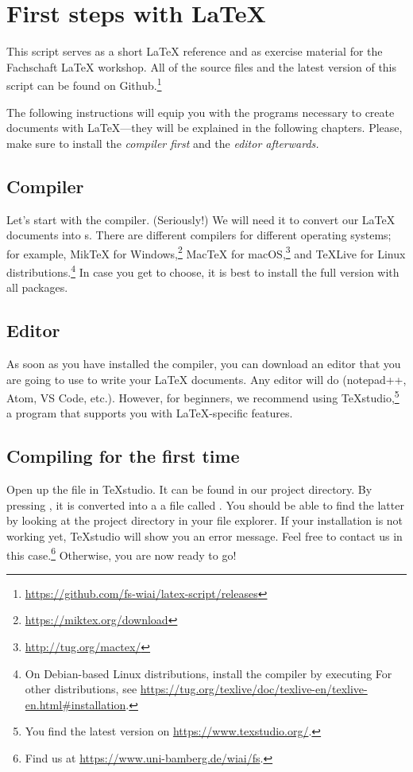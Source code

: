 \newpage
{}
\pagecolor{latexblue}

\chapter*{First steps with \LaTeX}

This script serves as a short \LaTeX{} reference and as exercise material for the Fachschaft  \LaTeX{} workshop.
All of the source files and the latest version of this script can be found on Github.\footnote{\url{https://github.com/fs-wiai/latex-script/releases}}

The following instructions will equip you with the programs necessary to create documents with \LaTeX{}---they will be explained in the following chapters.
Please, make sure to install the \emph{compiler first} and the \emph{editor afterwards}\textit{.}

\section*{Compiler}
Let’s start with the compiler.
(Seriously!)
We will need it to convert our \LaTeX{} documents into s.
There are different compilers for different operating systems;
for example, MikTeX for Windows,\footnote{\url{https://miktex.org/download}} Mac\TeX{} for macOS,\footnote{\url{http://tug.org/mactex/}} and \TeX{}Live for Linux distributions.\footnote{On Debian-based Linux distributions, install the compiler by executing 
For other distributions, see \url{https://tug.org/texlive/doc/texlive-en/texlive-en.html\#installation}.}
In case you get to choose, it is best to install the full version with all packages.

\section*{Editor}
As soon as you have installed the compiler, you can download an editor that you are going to use to write your \LaTeX{} documents.
Any editor will do (notepad++, Atom, VS Code, etc.).
However, for beginners, we recommend using \TeX{}studio,\footnote{You find the latest version on \url{https://www.texstudio.org/}.} a program that supports you with \LaTeX-specific features.

\section*{Compiling for the first time}
Open up the file  in \TeX{}studio. 
It can be found in our project directory.
By pressing \faForward, it is converted into a a file called .
You should be able to find the latter by looking at the project directory in your file explorer.
If your installation is not working yet, \TeX{}studio will show you an error message.
Feel free to contact us in this case.\footnote{Find us at \url{https://www.uni-bamberg.de/wiai/fs}.}
Otherwise, you are now ready to go!

\newpage
\nopagecolor

